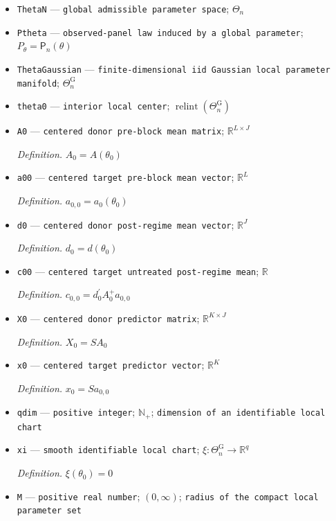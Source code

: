 \documentclass{article}
\begin{document}
\begin{itemize}
  \item \texttt{ThetaN} --- \texttt{global admissible parameter space}; \(\Theta_n\)
  \item \texttt{Ptheta} --- \texttt{observed-\allowbreak{}panel law induced by a global parameter}; \(P_{\theta}=\mathsf P_n(\theta)\)
  \item \texttt{ThetaGaussian} --- \texttt{finite-\allowbreak{}dimensional iid Gaussian local parameter manifold}; \(\Theta_n^{\mathrm G}\)
  \item \texttt{theta0} --- \texttt{interior local center}; \(\operatorname{relint}(\Theta_n^{\mathrm G})\)
  \item \texttt{A0} --- \texttt{centered donor pre-\allowbreak{}block mean matrix}; \(\mathbb R^{L\times J}\)
  \par\smallskip\noindent\emph{Definition.} \(A_0=A(\theta_0)\)
  \item \texttt{a00} --- \texttt{centered target pre-\allowbreak{}block mean vector}; \(\mathbb R^L\)
  \par\smallskip\noindent\emph{Definition.} \(a_{0,0}=a_0(\theta_0)\)
  \item \texttt{d0} --- \texttt{centered donor post-\allowbreak{}regime mean vector}; \(\mathbb R^J\)
  \par\smallskip\noindent\emph{Definition.} \(d_0=d(\theta_0)\)
  \item \texttt{c00} --- \texttt{centered target untreated post-\allowbreak{}regime mean}; \(\mathbb R\)
  \par\smallskip\noindent\emph{Definition.} \(c_{0,0}=d_0^{\prime}A_0^+a_{0,0}\)
  \item \texttt{X0} --- \texttt{centered donor predictor matrix}; \(\mathbb R^{K\times J}\)
  \par\smallskip\noindent\emph{Definition.} \(X_0=SA_0\)
  \item \texttt{x0} --- \texttt{centered target predictor vector}; \(\mathbb R^K\)
  \par\smallskip\noindent\emph{Definition.} \(x_0=Sa_{0,0}\)
  \item \texttt{qdim} --- \texttt{positive integer}; \(\mathbb N_{+}\); \texttt{dimension of an identifiable local chart}
  \item \texttt{xi} --- \texttt{smooth identifiable local chart}; \(\xi:\Theta_n^{\mathrm G}\to\mathbb R^q\)
  \par\smallskip\noindent\emph{Definition.} \(\xi(\theta_0)=0\)
  \item \texttt{M} --- \texttt{positive real number}; \((0,\infty)\); \texttt{radius of the compact local parameter set}

\end{itemize}
\end{document}
